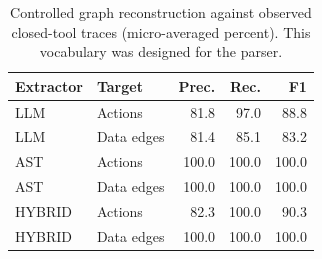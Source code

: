 \begin{table}[t]
\caption{Controlled graph reconstruction against observed closed-tool traces (micro-averaged percent). This vocabulary was designed for the parser.}
\label{tab:components}
\centering\small
\begin{tabular}{llrrr}
\toprule
Extractor & Target & Prec. & Rec. & F1 \\
\midrule
LLM & Actions & 81.8 & 97.0 & 88.8 \\
LLM & Data edges & 81.4 & 85.1 & 83.2 \\
AST & Actions & 100.0 & 100.0 & 100.0 \\
AST & Data edges & 100.0 & 100.0 & 100.0 \\
HYBRID & Actions & 82.3 & 100.0 & 90.3 \\
HYBRID & Data edges & 100.0 & 100.0 & 100.0 \\
\bottomrule
\end{tabular}
\end{table}